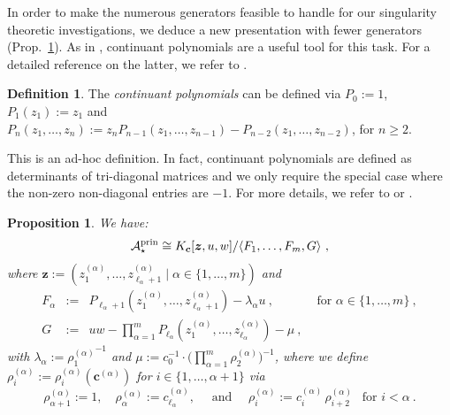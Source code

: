 \documentclass[letter,11pt]{amsart}
\newcommand{\KK}{\ensuremath{K}} %
\newcommand{\prin}{{\rm prin}}
\newcommand{\cA}{\mathcal{A}}
\renewcommand{\c}{{\boldsymbol{c}}}
\newcommand{\z}{\boldsymbol{z}}
\theoremstyle{theorem}
\newtheorem{prop}[Thm]{Proposition}
\theoremstyle{definition}
\newtheorem{defi}[Thm]{Definition} %
\newcommand{\len}{\ell}
\numberwithin{equation}{section}
\begin{document}
In order to make the numerous generators feasible to handle for our singularity theoretic investigations, 
we deduce a new presentation with fewer generators (Prop.~\ref{Prop:NewPresentation}).
As in \cite{BFMS23,BFMS25}, continuant polynomials are a useful tool for this task. 
For a detailed reference on the latter, we refer to \cite{Muir}.

\begin{defi}
	\label{Def:Continuants}
	The {\em continuant polynomials} can be defined via  
	$ P_0 := 1 $, $ P_1 (z_1) := z_1 $ and 
	$ P_n (z_1, \ldots, z_n) := z_{n} P_{n-1} (z_1, \ldots, z_{n-1}) - P_{n-2} (z_1, \ldots, z_{n-2}) $, for $ n \geq 2 $.  
\end{defi}

This is an ad-hoc definition. 
In fact, continuant polynomials are defined as determinants of tri-diagonal matrices and we only require the special case where the non-zero non-diagonal entries are $ - 1 $.
For more details, we refer to \cite[Section~4.1]{BFMS23} or \cite[Section~3]{BFMS25}. 


\begin{prop}
	\label{Prop:NewPresentation}
	We have: 
	\[
	\cA_\star^\prin 
	\cong 
	\KK_\c[\z, u , w ]
	/
	\langle 
	F_1, \ldots, F_m, G
	\rangle
	\ , 
	\]
	where $ \z := ( z_1^{(\alpha)}, \ldots, z_{\len_\alpha + 1}^{(\alpha)} \mid \alpha \in \{ 1, \ldots, m \}) $
	and
	\[
	\begin{array}{rcll}
		F_\alpha 
		& := & 
		P_{\len_\alpha +1} (z_1^{(\alpha)}, \ldots, z_{\len_\alpha + 1}^{(\alpha)}) 
		- \lambda_\alpha u
		\ , 
		& \mbox{ for } \alpha \in \{ 1, \ldots, m \} \ , 
		\\[10pt]
		G 
		& := &
		\displaystyle 
		u w - 
		\prod_{\alpha=1}^m P_{\len_\alpha} (z_1^{(\alpha)},  \ldots, z_{\len_\alpha}^{(\alpha)}) - \mu 
		\ ,
	\end{array} 
	\]
	with
	$ \lambda_\alpha := {\rho_{1}^{(\alpha)}}^{-1} $
	and
	$ \displaystyle  \mu := c_0^{-1} \cdot \Big( \prod_{\alpha=1}^m 
	\rho_{2}^{(\alpha)} \Big)^{-1} $,
	where we define $ \rho_i^{(\alpha)} := \rho_i^{(\alpha)}(\c^{(\alpha)}) $ for $ i \in \{ 1, \ldots, \alpha+1 \} $ via
	\[ %
		\rho_{\alpha+1}^{(\alpha)} := 1 
		,
		\quad  
		\rho_{\alpha}^{(\alpha)} := c_{\len_\alpha}^{(\alpha)} 
		,
		\quad
		\mbox{ and } 
		\quad 
		\rho_i^{(\alpha)} := c_{i}^{(\alpha)}
		\, \rho_{i+2}^{(\alpha)}
		\ \ 
		\mbox{ for } i < \alpha 
		\ . 
	\] %
\end{prop}
\end{document}
